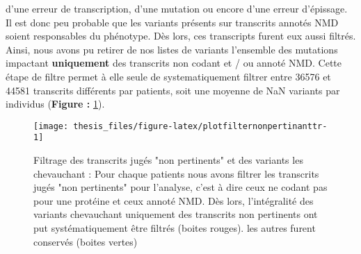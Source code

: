 \documentclass[12pt,twoside]{reedthesis}
\theoremstyle{definition}
\theoremstyle{definition}
\theoremstyle{remark}
\begin{document}
\begin{enumerate}
    d'une erreur de transcription, d'une mutation ou encore d'une erreur
    d'épissage. Il est donc peu probable que les variants présents sur
    transcrits annotés NMD soient responsables du phénotype. Dès lors, ces
    transcripts furent eux aussi filtrés. Ainsi, nous avons pu retirer de
    nos listes de variants l'ensemble des mutations impactant
    \textbf{uniquement} des transcrits non codant et / ou annoté NMD.
    Cette étape de filtre permet à elle seule de systematiquement filtrer
    entre 36576 et 44581 transcrits différents par patients, soit une
    moyenne de NaN variants par individus (\textbf{Figure :
    }\ref{fig:plotfilternonpertinanttr}).
  \end{enumerate}
  
  \begin{figure}
  
  {\centering \texttt{[image: thesis\_files/figure-latex/plotfilternonpertinanttr-1]} 
  
  }
  
  \caption[Filtrage des transcrits jugés "non pertinents" et des variants les chevauchant]{Filtrage des transcrits jugés "non pertinents" et des variants les chevauchant : Pour chaque patients nous avons filtrer les transcrits jugés "non pertinents" pour l'analyse, c'est à dire ceux ne codant pas pour une protéine et ceux annoté NMD. Dès lors, l'intégralité des variants chevauchant uniquement des transcrits non pertinents ont put systématiquement être filtrés (boites rouges). les autres furent conservés (boites vertes)}\label{fig:plotfilternonpertinanttr}
  \end{figure}
  
\end{document}
